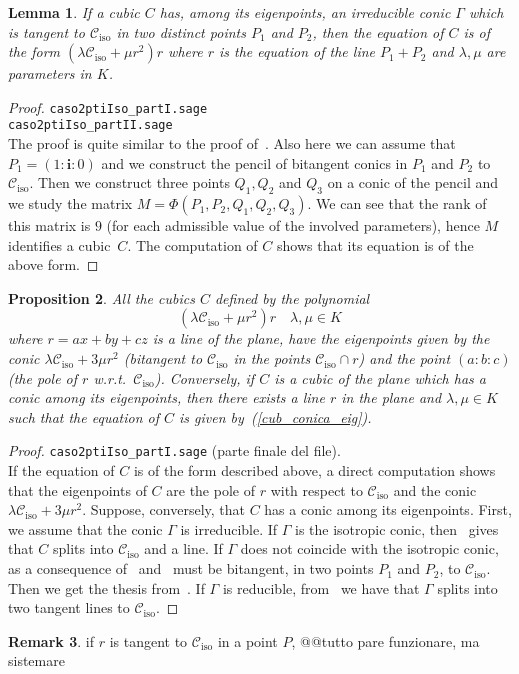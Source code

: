 \documentclass{amsart}
\theoremstyle{plain}
\newtheorem{lemma}{Lemma}[section]
\newtheorem{prop}[lemma]{Proposition}
\theoremstyle{definition}
\newtheorem{rmk}[lemma]{Remark}
\newcommand{\iso}{\mathcal{C}_{\mathrm{iso}}}
\newcommand{\iii}{\textbf{i}}
\begin{document}
\begin{lemma}
\label{lemma:bitangentToCiso}
If a cubic $C$ has, among its eigenpoints, an irreducible conic $\Gamma$
which is tangent to $\iso$ in two distinct points $P_1$ and $P_2$, then
the equation of $C$ is of the form $(\lambda \iso + \mu r^2)r$ where
$r$ is the equation of the line $P_1+P_2$ and $\lambda, \mu$ are parameters
in $K$.
\end{lemma}
\begin{proof}
\verb+caso2ptiIso_partI.sage+\\
\verb+caso2ptiIso_partII.sage+\\
The proof is quite similar to the proof of~. Also
here we can assume that $P_1 = (1: \iii: 0)$ and we construct the pencil of
bitangent conics in $P_1$ and $P_2$ to $\iso$. Then we construct three
points $Q_1, Q_2$ and $Q_3$ on a conic of the pencil
and we study the matrix $M = \Phi(P_1, P_2, Q_1, Q_2, Q_3)$. We can see
that the rank of this matrix is $9$ (for each admissible value of the
involved parameters), hence $M$ identifies a cubic~$C$. The computation
of $C$ shows that its equation is of the above form.
\end{proof}


\begin{prop} All the cubics $C$ defined by the polynomial
\begin{equation}
\label{cub_conica_eig}
(\lambda \iso + \mu r^2)r \quad \mbox{$\lambda, \mu \in K$}
\end{equation}
where $r=ax+by+cz$ is a line of the plane,
have the eigenpoints given by the conic
$\lambda \iso+3\mu r^2$ (bitangent to $\iso$ in the points $\iso \cap r$)
and the point $(a:b:c)$ (the pole of $r$
w.r.t.\ $\iso$). Conversely, if
$C$ is a cubic of the plane which has a conic among its eigenpoints,
then there exists a line $r$ in the plane and $\lambda, \mu \in K$
such that the equation of
$C$ is given by~(\ref{cub_conica_eig}).
\end{prop}
\begin{proof}
\verb+caso2ptiIso_partI.sage+ (parte finale del file).\\
If the equation of $C$ is of the form described above, a direct computation
shows that the eigenpoints of $C$ are the pole of $r$ with respect to $\iso$
and the conic $\lambda \iso+3\mu r^2$. Suppose, conversely, that $C$ has
a conic among its eigenpoints. First, we assume that the conic $\Gamma$
is irreducible. If $\Gamma$ is the isotropic conic,
then~ gives that $C$ splits into $\iso$ and a line.
If $\Gamma$ does not coincide with the
isotropic conic, as a consequence
of~ and~ must be bitangent,
in two points $P_1$ and $P_2$, to $\iso$. Then we get the thesis
from~. If $\Gamma$ is reducible,
from~  we have that $\Gamma$ splits
into two tangent lines to $\iso$.
\end{proof}
\begin{rmk}
if $r$ is tangent to $\iso$ in a point $P$, @@tutto pare funzionare,
ma sistemare
\end{rmk}
\end{document}
